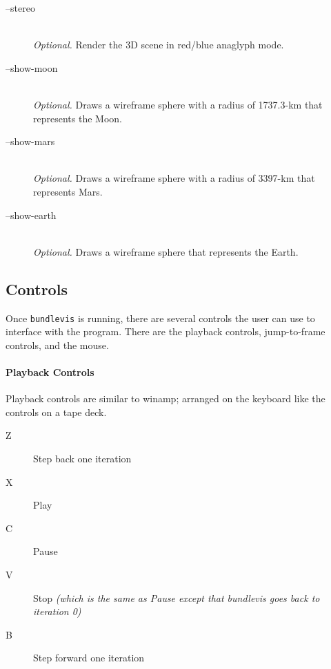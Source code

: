 \begin{description}
\item[--stereo] \hfill \\

  \emph{Optional.} Render the 3D scene in red/blue anaglyph mode.

\item[--show-moon] \hfill \\

  \emph{Optional.} Draws a wireframe sphere with a radius of 1737.3-km
  that represents the Moon.

\item[--show-mars] \hfill \\

  \emph{Optional.} Draws a wireframe sphere with a radius of 3397-km
  that represents Mars.

\item[--show-earth] \hfill \\

  \emph{Optional.} Draws a wireframe sphere that represents the Earth.

\end{description}

\subsection{Controls}

Once \texttt{bundlevis} is running, there are several controls the
user can use to interface with the program. There are the playback
controls, jump-to-frame controls, and the mouse.

\paragraph{Playback Controls}

Playback controls are similar to winamp; arranged on the keyboard like
the controls on a tape deck.

\newenvironment{myindentpar}[1]
               {\begin{list}{}
                   {\setlength{\leftmargin}{#1}}
                 \item[]
               }
               {\end{list}}

\begin{myindentpar}{3cm}
\begin{description}
  \item[Z] Step back one iteration
  \item[X] Play
  \item[C] Pause
  \item[V] Stop \emph{(which is the same as Pause except that
    bundlevis goes back to iteration 0)}
  \item[B] Step forward one iteration
\end{description}
\end{myindentpar}

